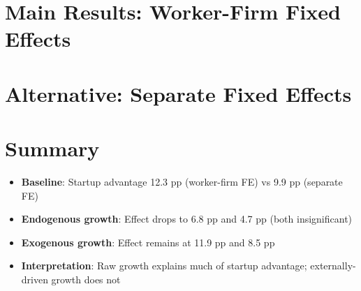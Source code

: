 \documentclass[11pt]{article}
\begin{document}
\section{Main Results: Worker-Firm Fixed Effects}



\section{Alternative: Separate Fixed Effects}



\section{Summary}

\begin{itemize}
\item \textbf{Baseline}: Startup advantage 12.3 pp (worker-firm FE) vs 9.9 pp (separate FE)
\item \textbf{Endogenous growth}: Effect drops to 6.8 pp and 4.7 pp (both insignificant)
\item \textbf{Exogenous growth}: Effect remains at 11.9 pp and 8.5 pp
\item \textbf{Interpretation}: Raw growth explains much of startup advantage; externally-driven growth does not
\end{itemize}
\end{document}

